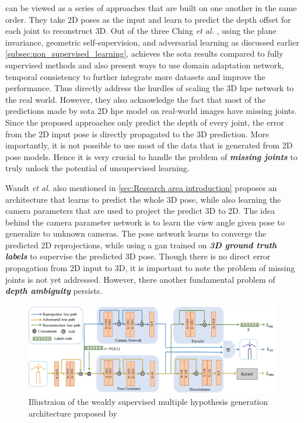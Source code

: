 \cite{unsupervisedAdversarial, can3dpose, amazon1} can be viewed as a series of approaches that are built on one another in the same order. They take 2D poses as the input and learn to predict the depth offset for each joint to reconstruct 3D. Out of the three Ching \textit{et al.} \cite{amazon1}, using the plane invariance, geometric self-supervision, and adversarial learning as discussed earlier \ref{subsec:non_supervised_learning}, achieves the \ac{sota} results compared to fully supervised methods and also present ways to use domain adaptation network, temporal consistency to further integrate more datasets and improve the performance. Thus directly address the hurdles of scaling the 3D \ac{hpe} network to the real world. However, they also acknowledge the fact that most of the predictions made by \ac{sota} 2D \ac{hpe} model on real-world images have missing joints. Since the proposed approaches only predict the depth of every joint, the error from the 2D input pose is directly propagated to the 3D prediction. More importantly, it is not possible to use most of the data that is generated from 2D pose models. Hence it is very crucial to handle the problem of \textit{\textbf{missing joints}} to truly unlock the potential of unsupervised learning.

Wandt \textit{et al.} \cite{repnet} also mentioned in \ref{sec:Research area introduction} proposes an architecture that learns to predict the whole 3D pose, while also learning the camera parameters that are used to project the predict 3D to 2D. The idea behind the camera parameter network is to learn the view angle given pose to generalize to unknown cameras. The pose network learns to converge the predicted 2D reprojections, while using a \ac{gan} trained on \textit{\textbf{3D ground truth labels}} to supervise the predicted 3D pose. Though there is no direct error propagation from 2D input to 3D, it is important to note the problem of missing joints is not yet addressed. However, there another fundamental problem of \textit{\textbf{depth ambiguity}} persists. 

\begin{figure}[h]
    \centering
    \includegraphics[width=\linewidth]{figures/background/multi_arch.pdf}
    \caption{Illustraion of the weakly supervised multiple hypothesis generation architecture proposed by \cite{weaklymultiple}}
    \label{fig:multi_arch}
\end{figure}


